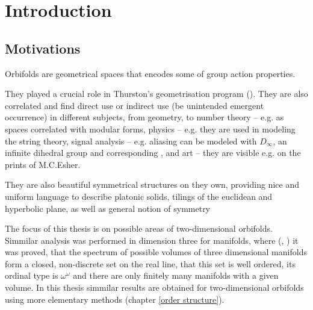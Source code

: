 \chapter{Introduction}
\setcounter{page}{9}
\section{Motivations}
Orbifolds are geometrical spaces that encodes some of group action properties. 

They played a crucial role in Thurston's geometrisation program (\cite{Thurston1979}). 
They are also correlated and find direct use or indirect use (be unintended 
emergent occurrence) 
in different subjects, 
from geometry, to number theory -- e.g. as spaces correlated with modular forms, 
physics -- e.g. they are used in modeling the string theory, 
signal analysis -- e.g. aliasing can be modeled with $D_\infty$, an 
infinite dihedral group and corresponding , and art -- they are visible e.g. 
on the prints of M.C.Esher.  

They are also beautiful symmetrical structures on they own, providing 
nice 
and uniform language to describe platonic solids, tilings of the euclidean 
and hyperbolic plane, 
as well as general notion of symmetry

The focus of this thesis is on possible areas of two-dimensional orbifolds.
Simmilar analysis was performed in dimension three for manifolds, where 
(\cite{Thurston1979}, \cite{Gromov1981}) it was proved, that the spectrum of possible volumes 
of three dimensional manifolds form a closed, non-discrete set on the real line, 
that this set is well ordered, its ordinal type is $\omega^\omega$ and there are 
only finitely many manifolds with a given volume. 
In this thesis
simmilar results 
are obtained 
for two-dimensional orbifolds 
using more elementary methods
(chapter \ref{order structure}). 

